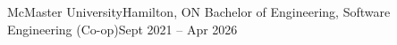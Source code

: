 \resumeSubHeadingListStart

\resumeSubheading
  {McMaster University}{Hamilton, ON}
  {Bachelor of Engineering, Software Engineering (Co-op)}{Sept 2021 -- Apr 2026}

\resumeSubHeadingListEnd
